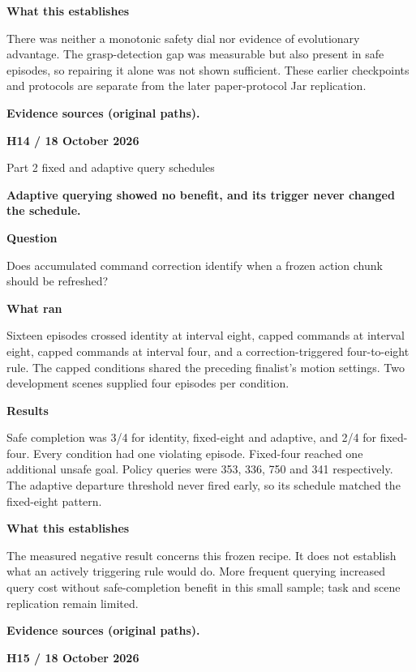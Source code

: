 \documentclass[11pt,a4paper]{article}
\newcommand{\block}[2]{\par\textbf{\color{ink}#1}\par\nopagebreak #2\par}
\newcommand{\finding}[1]{\begin{tcolorbox}[colback=pale,colframe=pale,boxrule=0pt,arc=1mm,left=10pt,right=10pt,top=10pt,bottom=10pt]\color{ink}\large\bfseries #1\end{tcolorbox}}
\begin{document}
\block{What this establishes}{There was neither a monotonic safety dial nor evidence of evolutionary advantage. The grasp-detection gap was measurable but also present in safe episodes, so repairing it alone was not shown sufficient. These earlier checkpoints and protocols are separate from the later paper-protocol Jar replication.}
\vfill{\footnotesize\color{muted}\textbf{Evidence sources (original paths).}\par
\raggedright {}\par {}}
\clearpage
{}\label{exp:H14}
{\color{accent}\small\bfseries H14 / 18 October 2026}\par
{}\par
{\color{muted}\small Part 2 fixed and adaptive query schedules}\par\vspace{2mm}
\finding{Adaptive querying showed no benefit, and its trigger never changed the schedule.}
\block{Question}{Does accumulated command correction identify when a frozen action chunk should be refreshed?}
\block{What ran}{Sixteen episodes crossed identity at interval eight, capped commands at interval eight, capped commands at interval four, and a correction-triggered four-to-eight rule. The capped conditions shared the preceding finalist's motion settings. Two development scenes supplied four episodes per condition.}
\block{Results}{Safe completion was 3/4 for identity, fixed-eight and adaptive, and 2/4 for fixed-four. Every condition had one violating episode. Fixed-four reached one additional unsafe goal. Policy queries were 353, 336, 750 and 341 respectively. The adaptive departure threshold never fired early, so its schedule matched the fixed-eight pattern.}
\block{What this establishes}{The measured negative result concerns this frozen recipe. It does not establish what an actively triggering rule would do. More frequent querying increased query cost without safe-completion benefit in this small sample; task and scene replication remain limited.}
\vfill{\footnotesize\color{muted}\textbf{Evidence sources (original paths).}\par
\raggedright {}}
\clearpage
{}\label{exp:H15}
{\color{accent}\small\bfseries H15 / 18 October 2026}\par
\end{document}
